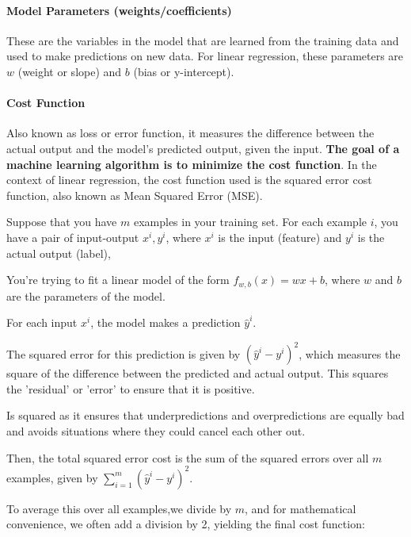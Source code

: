 \documentclass[a4paper]{article}
\begin{document}
    \paragraph*{Model Parameters (weights/coefficients)} These are the variables in the model that are learned from the training data and used to make predictions on new data. For linear regression, these parameters are \(w\) (weight or slope) and \(b\) (bias or y-intercept).

    \paragraph*{Cost Function} Also known as loss or error function, it measures the difference between the actual output and the model's predicted output, given the input. \textbf{The goal of a machine learning algorithm is to minimize the cost function}. In the context of linear regression, the cost function used is the squared error cost function, also known as Mean Squared Error (MSE). 

    Suppose that you have \(m\) examples in your training set. For each example \(i\), you have a pair of input-output \(x^i, y^i\), where \(x^i\) is the input (feature) and \(y^i\) is the actual output (label),

    You're trying to fit a linear model of the form \(f_{w,b}(x) = wx + b\), where \(w\) and \(b\) are the parameters of the model. 

    For each input \(x^i\), the model makes a prediction \(\hat{y}^i\).

    The squared error for this prediction is given by \((\hat{y}^i - y^i)^2\), which measures the square of the difference between the predicted and actual output. This squares the 'residual' or 'error' to ensure that it is positive. 

    \begin{center}
        \begin{YStkyNote}[Note]
            Is squared as it ensures that underpredictions and overpredictions are equally bad and avoids situations where they could cancel each other out.
        \end{YStkyNote}
    \end{center}

    Then, the total squared error cost is the sum of the squared errors over all \(m\) examples, given by \(\sum_{i=1}^{m}(\hat{y}^i - y^i)^2\).

    To average this over all examples,we divide by \(m\), and for mathematical convenience, we often add a division by 2, yielding the final cost function: 
    
\end{document}
